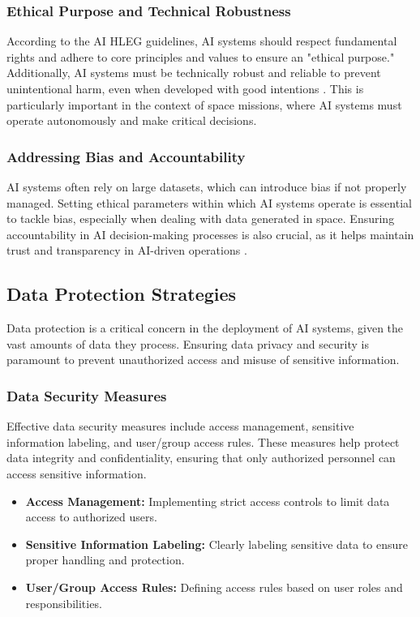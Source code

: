 \documentclass[a4paper,12pt]{article}
\begin{document}
\subsubsection{Ethical Purpose and Technical Robustness}

According to the AI HLEG guidelines, AI systems should respect fundamental rights and adhere to core principles and values to ensure an "ethical purpose." Additionally, AI systems must be technically robust and reliable to prevent unintentional harm, even when developed with good intentions \cite{ai_hleg_guidelines}. This is particularly important in the context of space missions, where AI systems must operate autonomously and make critical decisions.

\subsubsection{Addressing Bias and Accountability}

AI systems often rely on large datasets, which can introduce bias if not properly managed. Setting ethical parameters within which AI systems operate is essential to tackle bias, especially when dealing with data generated in space. Ensuring accountability in AI decision-making processes is also crucial, as it helps maintain trust and transparency in AI-driven operations \cite{house_of_commons_report}.

\subsection{Data Protection Strategies}

Data protection is a critical concern in the deployment of AI systems, given the vast amounts of data they process. Ensuring data privacy and security is paramount to prevent unauthorized access and misuse of sensitive information.

\subsubsection{Data Security Measures}

Effective data security measures include access management, sensitive information labeling, and user/group access rules. These measures help protect data integrity and confidentiality, ensuring that only authorized personnel can access sensitive information.

\begin{itemize}
    \item \textbf{Access Management:} Implementing strict access controls to limit data access to authorized users.
    \item \textbf{Sensitive Information Labeling:} Clearly labeling sensitive data to ensure proper handling and protection.
    \item \textbf{User/Group Access Rules:} Defining access rules based on user roles and responsibilities.
\end{itemize}
\end{document}
